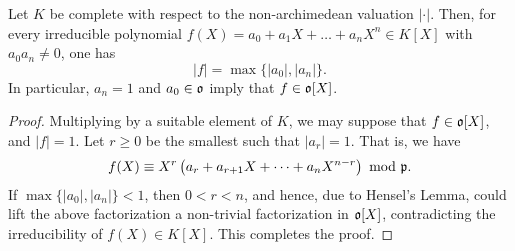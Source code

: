 \begin{corollary}
    Let $K$ be complete with respect to the non-archimedean valuation $|\cdot|$. Then, for every irreducible polynomial $f(X) = a_0 + a_1X + \dots + a_n X^n\in K[X]$ with $a_0a_n\ne 0$, one has 
    \begin{equation*}
        |f| = \max\{|a_0|, |a_n|\}.
    \end{equation*}
    In particular, $a_n = 1$ and $a_0\in\mathfrak{o}$ imply that $f\in\mathfrak{o}[X]$.
\end{corollary}
\begin{proof}
    Multiplying by a suitable element of $K$, we may suppose that $f\in\mathfrak{o}[X]$, and $|f| = 1$. Let $r\ge 0$ be the smallest such that $|a_r| = 1$. That is, we have 
    \begin{equation*}
        f(X)\equiv X^r\left(a_r + a_{r + 1}X + \cdots + a_n X^{n - r}\right)~\mathrm{mod}~\mathfrak{p}.
    \end{equation*}
    If $\max\{|a_0|, |a_n|\} < 1$, then $0 < r < n$, and hence, due to Hensel's Lemma, could lift the above factorization a non-trivial factorization in $\mathfrak{o}[X]$, contradicting the irreducibility of $f(X)\in K[X]$. This completes the proof.
\end{proof}

